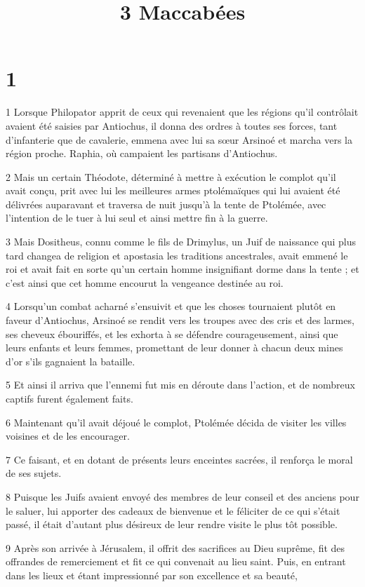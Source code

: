 

\title{3 Maccabées}


\chapter{1}

\par 1 Lorsque Philopator apprit de ceux qui revenaient que les régions qu'il contrôlait avaient été saisies par Antiochus, il donna des ordres à toutes ses forces, tant d'infanterie que de cavalerie, emmena avec lui sa sœur Arsinoé et marcha vers la région proche. Raphia, où campaient les partisans d'Antiochus.
\par 2 Mais un certain Théodote, déterminé à mettre à exécution le complot qu'il avait conçu, prit avec lui les meilleures armes ptolémaïques qui lui avaient été délivrées auparavant et traversa de nuit jusqu'à la tente de Ptolémée, avec l'intention de le tuer à lui seul et ainsi mettre fin à la guerre.
\par 3 Mais Dositheus, connu comme le fils de Drimylus, un Juif de naissance qui plus tard changea de religion et apostasia les traditions ancestrales, avait emmené le roi et avait fait en sorte qu'un certain homme insignifiant dorme dans la tente ; et c'est ainsi que cet homme encourut la vengeance destinée au roi.
\par 4 Lorsqu'un combat acharné s'ensuivit et que les choses tournaient plutôt en faveur d'Antiochus, Arsinoé se rendit vers les troupes avec des cris et des larmes, ses cheveux ébouriffés, et les exhorta à se défendre courageusement, ainsi que leurs enfants et leurs femmes, promettant de leur donner à chacun deux mines d'or s'ils gagnaient la bataille.
\par 5 Et ainsi il arriva que l'ennemi fut mis en déroute dans l'action, et de nombreux captifs furent également faits.
\par 6 Maintenant qu'il avait déjoué le complot, Ptolémée décida de visiter les villes voisines et de les encourager.
\par 7 Ce faisant, et en dotant de présents leurs enceintes sacrées, il renforça le moral de ses sujets.
\par 8 Puisque les Juifs avaient envoyé des membres de leur conseil et des anciens pour le saluer, lui apporter des cadeaux de bienvenue et le féliciter de ce qui s'était passé, il était d'autant plus désireux de leur rendre visite le plus tôt possible.
\par 9 Après son arrivée à Jérusalem, il offrit des sacrifices au Dieu suprême, fit des offrandes de remerciement et fit ce qui convenait au lieu saint. Puis, en entrant dans les lieux et étant impressionné par son excellence et sa beauté,
